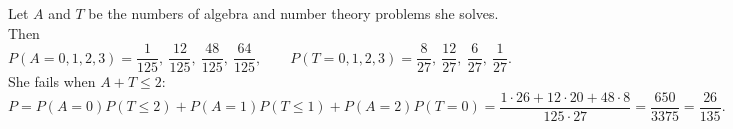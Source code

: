 Let $A$ and $T$ be the numbers of algebra and number theory problems she solves. Then
\[P(A=0,1,2,3)=\dfrac{1}{125},\ \dfrac{12}{125},\ \dfrac{48}{125},\ \dfrac{64}{125},\qquad P(T=0,1,2,3)=\dfrac{8}{27},\ \dfrac{12}{27},\ \dfrac{6}{27},\ \dfrac{1}{27}.\]
She fails when $A+T\le2$:
\[P=P(A=0)P(T\le2)+P(A=1)P(T\le1)+P(A=2)P(T=0)=\dfrac{1\cdot26+12\cdot20+48\cdot8}{125\cdot27}=\dfrac{650}{3375}=\boxed{\dfrac{26}{135}}.\]
